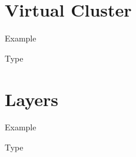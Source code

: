 \documentclass[11pt]{article}
\begin{document}
\section{Virtual Cluster}

Example

\begin{quote}

\end{quote}

Type

\begin{quote}

\end{quote}

\section{Layers}

Example

\begin{quote}

\end{quote}

Type

\begin{quote}

\end{quote}
\end{document}
